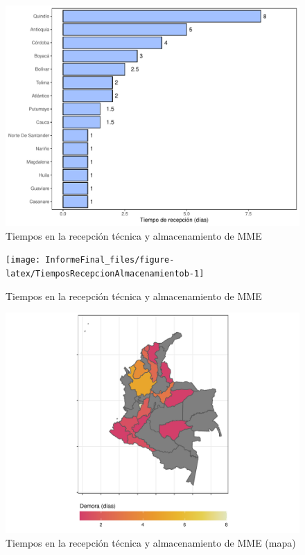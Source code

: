 \documentclass[
]{book}
\begin{document}

\begin{figure}
\includegraphics[width=0.85\linewidth]{InformeFinal_files/figure-latex/TiemposRecepcionAlmacenamiento-1} \caption{Tiempos en la recepción técnica y almacenamiento de MME}\label{fig:TiemposRecepcionAlmacenamiento}
\end{figure}

\begin{figure}
\texttt{[image: InformeFinal\_files/figure-latex/TiemposRecepcionAlmacenamientob-1]} \caption{Tiempos en la recepción técnica y almacenamiento de MME}\label{fig:TiemposRecepcionAlmacenamientob}
\end{figure}

\begin{figure}
\includegraphics[width=0.85\linewidth]{InformeFinal_files/figure-latex/TiemposRecepcionAlmacenamientoMapa-1} \caption{Tiempos en la recepción técnica y almacenamiento de MME (mapa)}\label{fig:TiemposRecepcionAlmacenamientoMapa}
\end{figure}
\end{document}
